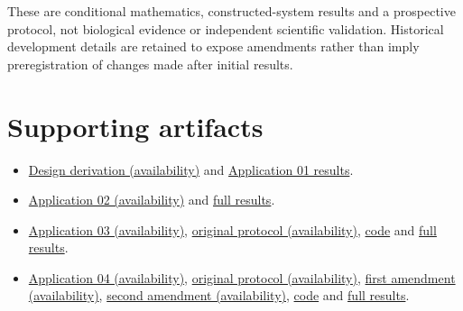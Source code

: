 \documentclass[
  american,
  11pt,
  letterpaper,
]{article}
\providecommand{\tightlist}{%
  \setlength{\itemsep}{0pt}\setlength{\parskip}{0pt}}
\begin{document}
These are conditional mathematics, constructed-system results and a prospective protocol, not biological evidence or independent scientific validation. Historical development details are retained to expose amendments rather than imply preregistration of changes made after initial results.

\section{Supporting artifacts}\label{supporting-artifacts}

\begin{itemize}
\tightlist
\item
  \href{https://github.com/v5ma/v5ma.github.io/blob/master/papers/companions/learning-to-feel-v1.0/ARTIFACT-AVAILABILITY.md\#artifact-10}{Design derivation (availability)} and \href{https://github.com/v5ma/v5ma.github.io/blob/master/papers/companions/learning-to-feel-v1.0/analysis/phase-learning-design-results.json}{Application 01 results}.
\item
  \href{https://github.com/v5ma/v5ma.github.io/blob/master/papers/companions/learning-to-feel-v1.0/ARTIFACT-AVAILABILITY.md\#artifact-2}{Application 02 (availability)} and \href{https://github.com/v5ma/v5ma.github.io/blob/master/papers/companions/learning-to-feel-v1.0/analysis/receiver-level-inference-results.json}{full results}.
\item
  \href{https://github.com/v5ma/v5ma.github.io/blob/master/papers/companions/learning-to-feel-v1.0/ARTIFACT-AVAILABILITY.md\#artifact-3}{Application 03 (availability)}, \href{https://github.com/v5ma/v5ma.github.io/blob/master/papers/companions/learning-to-feel-v1.0/ARTIFACT-AVAILABILITY.md\#artifact-4}{original protocol (availability)}, \href{https://github.com/v5ma/v5ma.github.io/blob/master/papers/companions/learning-to-feel-v1.0/analysis/learned-receiver-application.mjs}{code} and \href{https://github.com/v5ma/v5ma.github.io/blob/master/papers/companions/learning-to-feel-v1.0/analysis/learned-receiver-results.json}{full results}.
\item
  \href{https://github.com/v5ma/v5ma.github.io/blob/master/papers/companions/learning-to-feel-v1.0/ARTIFACT-AVAILABILITY.md\#artifact-8}{Application 04 (availability)}, \href{https://github.com/v5ma/v5ma.github.io/blob/master/papers/companions/learning-to-feel-v1.0/ARTIFACT-AVAILABILITY.md\#artifact-7}{original protocol (availability)}, \href{https://github.com/v5ma/v5ma.github.io/blob/master/papers/companions/learning-to-feel-v1.0/ARTIFACT-AVAILABILITY.md\#artifact-5}{first amendment (availability)}, \href{https://github.com/v5ma/v5ma.github.io/blob/master/papers/companions/learning-to-feel-v1.0/ARTIFACT-AVAILABILITY.md\#artifact-6}{second amendment (availability)}, \href{https://github.com/v5ma/v5ma.github.io/blob/master/papers/companions/learning-to-feel-v1.0/analysis/reciprocal-reconstruction.mjs}{code} and \href{https://github.com/v5ma/v5ma.github.io/blob/master/papers/companions/learning-to-feel-v1.0/analysis/reciprocal-reconstruction-results.json}{full results}.

\end{itemize}
\end{document}
